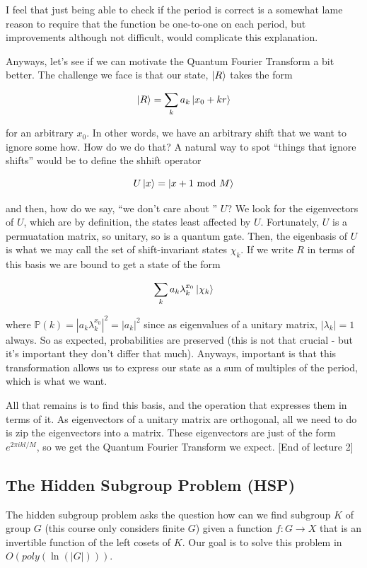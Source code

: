 \documentclass{article}
\theoremstyle{definition}
\begin{document}
I feel that just being able to check if the period is correct is a somewhat lame
reason to require that the function be one-to-one on each period, but
improvements although not difficult, would complicate this explanation.

Anyways, let's see if we can motivate the Quantum Fourier Transform a bit
better. The challenge we face is that our state, $\ket{R}$ takes the form

$$ \ket{R} = \sum_k a_k \ket{x_0 + kr} $$

for an arbitrary $x_0$. In other words, we have an arbitrary shift that we want
to ignore some how. How do we do that? A natural way to spot ``things that
ignore shifts'' would be to define the shhift operator

$$ U \ket{x} = \ket{x + 1 \text{ mod } M} $$

and then, how do we say, ``we don't care about '' $U$? We look for the
eigenvectors of $U$, which are by definition, the states least affected by $U$.
Fortunately, $U$ is a permuatation matrix, so unitary, so is a quantum gate.
Then, the eigenbasis of $U$ is what we may call the set of shift-invariant
states $\chi_k$. If we write $R$ in terms of this basis we are bound to get a
state of the form

$$ \sum_k a_k \lambda_k^{x_0} \ket{\chi_k} $$

where $\mathbb{P}(k) = |a_k \lambda_k^{x_0}|^2 = |a_k|^2$ since as eigenvalues
of a unitary matrix, $|\lambda_k| = 1$ always. So as expected, probabilities are
preserved (this is not that crucial - but it's important they don't differ that
much). Anyways, important is that this transformation allows us to express our
state as a sum of multiples of the period, which is what we want.

All that remains is to find this basis, and the operation that expresses them in
terms of it. As eigenvectors of a unitary matrix are orthogonal, all we need to
do is zip the eigenvectors into a matrix. These eigenvectors are just of the
form $e^{2\pi i k l/ M}$, so we get the Quantum Fourier Transform we expect.
[End of lecture 2]

\subsection{The Hidden Subgroup Problem (HSP)}

The hidden subgroup problem asks
the question how can we find subgroup $K$ of group $G$ (this course only
considers finite $G$) given a function $f : G \to X$ that is an invertible
function of the left cosets of $K$. Our goal is to solve this problem in
$O(poly(\ln(|G|)))$.
\end{document}
